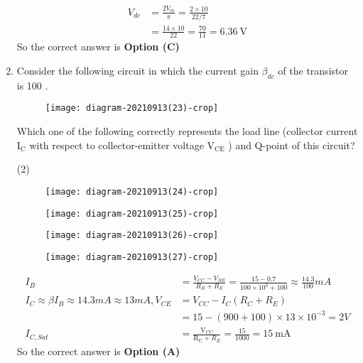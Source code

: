 \begin{enumerate}
\begin{answer}
\begin{align*}
V_{d c}&=\frac{2 V_{m}}{\pi}=\frac{2 \times 10}{22 / 7}\\&=\frac{14 \times 10}{22}=\frac{70}{11}=6.36 \mathrm{~V}
\end{align*}
So the correct answer is \textbf{Option (C)}
\end{answer}
	\item Consider the following circuit in which the current gain $\beta_{d c}$ of the transistor is 100 .
	\begin{figure}[H]
		\centering
		\texttt{[image: diagram-20210913(23)-crop]}
	\end{figure}
	Which one of the following correctly represents the load line (collector current $\mathrm{I}_{\mathrm{C}}$ with respect to collector-emitter voltage $\mathrm{V}_{\mathrm{CE}}$ ) and Q-point of this circuit?
\begin{tasks}(2)
\task[\textbf{A.}]\begin{figure}[H]
	\centering
	\texttt{[image: diagram-20210913(24)-crop]}
\end{figure}
\task[\textbf{B.}] \begin{figure}[H]
	\centering
	\texttt{[image: diagram-20210913(25)-crop]}
\end{figure}
\task[\textbf{C.}] \begin{figure}[H]
	\centering
	\texttt{[image: diagram-20210913(26)-crop]}
\end{figure}
\task[\textbf{D.}] \begin{figure}[H]
	\centering
	\texttt{[image: diagram-20210913(27)-crop]}
\end{figure}
\end{tasks}
\begin{answer}
\begin{align*}
I_{B}&=\frac{V_{C C}-V_{B E}}{R_{B}+R_{E}}=\frac{15-0.7}{100 \times 10^{3}+100} \approx \frac{14.3}{100} m A\\
I_{C} \approx \beta I_{B} \approx 14.3 m A \approx 13 m A, V_{C E}&=V_{C C}-I_{C}\left(R_{C}+R_{E}\right)\\&=15-(900+100) \times 13 \times 10^{-3}=2 V\\
I_{C, S a t}&=\frac{\mathrm{V}_{\mathrm{CC}}}{\mathrm{R}_{\mathrm{C}}+R_{E}}=\frac{15}{1000}=15 \mathrm{~mA}
\end{align*}
So the correct answer is \textbf{Option (A)}
\end{answer}

\end{enumerate}
